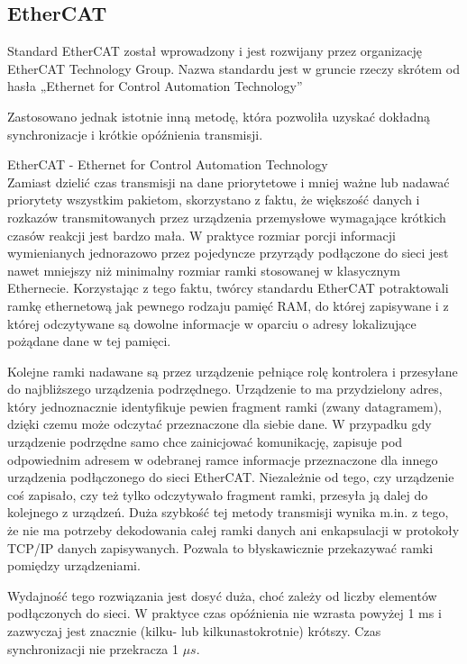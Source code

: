 \subsection{EtherCAT}
Standard EtherCAT został wprowadzony i jest rozwijany przez organizację EtherCAT Technology Group. Nazwa standardu jest w gruncie rzeczy skrótem od hasła „Ethernet for Control Automation Technology”

Zastosowano jednak istotnie inną metodę, która pozwoliła uzyskać dokładną synchronizacje i krótkie opóźnienia transmisji.

EtherCAT - Ethernet for Control Automation Technology \\

Zamiast dzielić czas transmisji na dane priorytetowe i mniej ważne lub nadawać priorytety wszystkim pakietom, skorzystano z faktu, że większość danych i rozkazów transmitowanych przez urządzenia przemysłowe wymagające krótkich czasów reakcji jest bardzo mała. W praktyce rozmiar porcji informacji wymienianych jednorazowo przez pojedyncze przyrządy podłączone do sieci jest nawet mniejszy niż minimalny rozmiar ramki stosowanej w klasycznym Ethernecie. Korzystając z tego faktu, twórcy standardu EtherCAT potraktowali ramkę ethernetową jak pewnego rodzaju pamięć RAM, do której zapisywane i z której odczytywane są dowolne informacje w oparciu o adresy lokalizujące pożądane dane w tej pamięci.

Kolejne ramki nadawane są przez urządzenie pełniące rolę kontrolera i przesyłane do najbliższego urządzenia podrzędnego. Urządzenie to ma przydzielony adres, który jednoznacznie identyfikuje pewien fragment ramki (zwany datagramem), dzięki czemu może odczytać przeznaczone dla siebie dane. W przypadku gdy urządzenie podrzędne samo chce zainicjować komunikację, zapisuje pod odpowiednim adresem w odebranej ramce informacje przeznaczone dla innego urządzenia podłączonego do sieci EtherCAT. Niezależnie od tego, czy urządzenie coś zapisało, czy też tylko odczytywało fragment ramki, przesyła ją dalej do kolejnego z urządzeń. Duża szybkość tej metody transmisji wynika m.in. z tego, że nie ma potrzeby dekodowania całej ramki danych ani enkapsulacji w protokoły TCP/IP danych zapisywanych. Pozwala to błyskawicznie przekazywać ramki pomiędzy urządzeniami.


Wydajność tego rozwiązania jest dosyć duża, choć zależy od liczby elementów podłączonych do sieci. W praktyce czas opóźnienia nie wzrasta powyżej 1 ms i zazwyczaj jest znacznie (kilku- lub kilkunastokrotnie) krótszy. Czas synchronizacji nie przekracza 1 $\mu s$.

